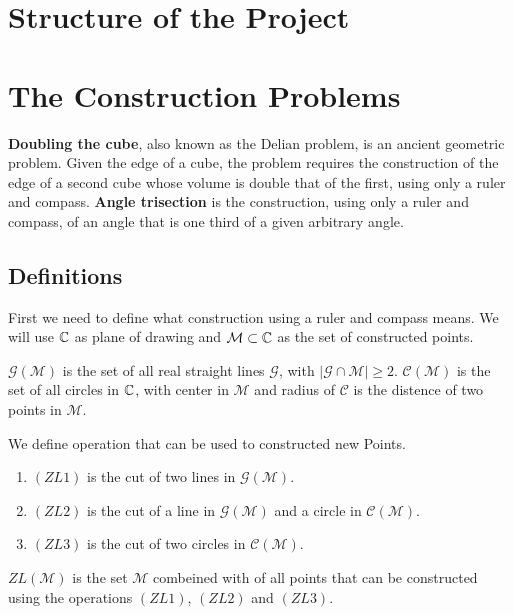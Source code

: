 \documentclass{../Project/TemplateExercise}
\begin{document}
\section{Structure of the Project}


\section{The Construction Problems}
\textbf{Doubling the cube}, also known as the Delian problem, is an ancient geometric problem.
Given the edge of a cube, the problem requires the construction of the edge of a second cube whose volume is double that of the first,
using only a ruler and compass.
\newline
\textbf{Angle trisection} is the construction, using only a ruler and compass, of an angle that is one third of a given arbitrary angle.

\subsection{Definitions}
First we need to define what construction using a ruler and compass means.
We will use $\mathbb{C}$ as plane of drawing and $\mathcal{M} \subset \mathbb{C}$ as the set of constructed points.
\begin{definition}
    $\mathcal{G(M)}$ is the set of all real straight lines $\mathcal{G}$, with $| \mathcal{G} \cap \mathcal{M} |\ge 2$. \newline
    $\mathcal{C(M)}$ is the set of all circles in $\mathbb{C}$, with center in $\mathcal{M}$ and radius of $\mathcal{C}$ is the distence of two points in $\mathcal{M}$.
\end{definition}

\begin{definition}
    We define operation that can be used to constructed new Points.
    \begin{enumerate}
        \item $(ZL 1)$ is the cut of two lines in $\mathcal{G(M)}$.
        \item $(ZL 2)$ is the cut of a line in $\mathcal{G(M)}$ and a circle in $\mathcal{C(M)}$.
        \item $(ZL 3)$ is the cut of two circles in $\mathcal{C(M)}$.
    \end{enumerate}
    $ZL(\mathcal{M})$ is the set $\mathcal{M}$ combeined with of all points that can be constructed using the operations $(ZL 1)$, $(ZL 2)$ and $(ZL 3)$.
\end{definition}
\end{document}
